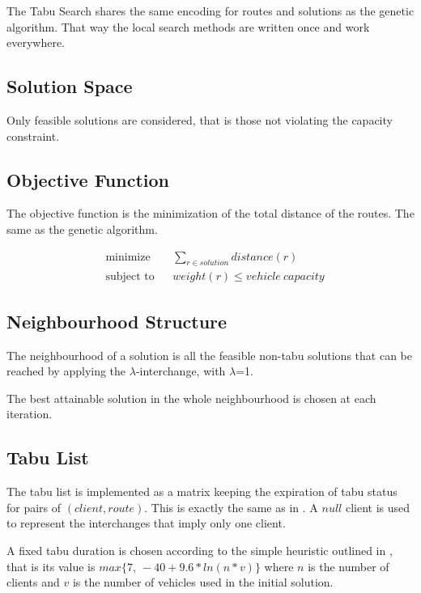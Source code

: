 \documentclass{article} %
\begin{document}
The Tabu Search shares the same encoding for routes and solutions as the genetic algorithm. That way the local search methods are written once and work everywhere.

\subsection{Solution Space}

Only feasible solutions are considered, that is those not violating the capacity constraint.


\subsection{Objective Function}

The objective function is the minimization of the total distance of the routes. The same as the genetic algorithm.

\begin{equation*}
\begin{aligned}
& \text{minimize}
& & \sum\limits_{r \in solution} distance(r) \\
& \text{subject to}
& & weight(r) \leq vehicle\ capacity
\end{aligned}
\end{equation*}


\subsection{Neighbourhood Structure}

The neighbourhood of a solution is all the feasible non-tabu solutions that can be reached by applying the $\lambda$-interchange, with $\lambda$=1.\newline

The best attainable solution in the whole neighbourhood is chosen at each iteration.


\subsection{Tabu List}

The tabu list is implemented as a matrix keeping the expiration of tabu status for pairs of $(client, route)$. This is exactly the same as in \citep{osman1993}. A $null$ client is used to represent the interchanges that imply only one client.\newline

A fixed tabu duration is chosen according to the simple heuristic outlined in \citep{osman1993}, that is its value is
$max\{7,\ -40+9.6*ln(n * v)\}$
where $n$ is the number of clients and $v$ is the number of vehicles used in the initial solution.
\end{document}
